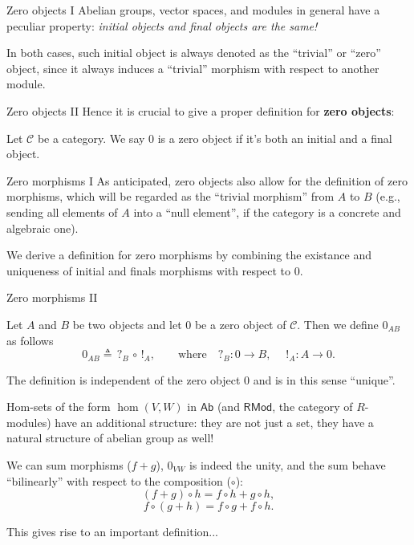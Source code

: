 \documentclass{beamer}
\newcommand{\cat}[1]{\mathsf{#1}}
\begin{document}
\begin{frame}{Zero objects I}
    Abelian groups, vector spaces, and modules in general have a peculiar property: \textit{initial objects and
    final objects are the same!} \medskip
    
    In both cases, such initial object is always
    denoted as the ``trivial'' or ``zero'' object, since it always induces a
    ``trivial'' morphism with respect to another module.
\end{frame}

\begin{frame}{Zero objects II}
    Hence it is crucial to give a proper definition for \textbf{zero objects}: \medskip
    
    \begin{definition}
        Let $\mathcal{C}$ be a category. We say $0$ is a
        zero object if it's both an initial and
        a final object.
    \end{definition}
\end{frame}

\begin{frame}{Zero morphisms I}
    As anticipated, zero objects also allow for the
    definition of zero morphisms, which will be regarded as the
    ``trivial morphism'' from $A$ to $B$ (e.g., sending all elements
    of $A$ into a ``null element'', if the category is a concrete and
    algebraic one). \medskip

    We derive a definition for zero morphisms
    by combining the existance and uniqueness of initial and finals morphisms
    with respect to $0$.
\end{frame}

\begin{frame}{Zero morphisms II}
    \begin{definition}
        Let $A$ and $B$ be two objects and let $0$ be a zero
        object of $\mathcal{C}$. Then we define $0_{AB}$ as
        follows
        \[
            0_{AB} \triangleq \, ?_{B} \, \circ \, !_{A}, \qquad \text{where} \quad ?_B : 0 \to B, \quad\; !_A : A \to 0.
        \]
    \end{definition}

    The definition is independent of the zero object $0$ and is
    in this sense ``unique''.
\end{frame}

\begin{frame}
    Hom-sets of the form $\hom(V, W)$ in $\cat{Ab}$ (and $\cat{RMod}$, the category
    of $R$-modules) have an additional
    structure: they are not just a set, they have a natural structure
    of abelian group as well! \medskip

    We can sum morphisms ($f + g$), $0_{VW}$ is indeed the unity,
    and the sum behave
    ``bilinearly'' with respect to the composition ($\circ$):
    \[
        (f + g) \circ h = f \circ h + g \circ h,
    \]
    \[
        f \circ (g + h) = f \circ g + f \circ h.
    \]

    This gives rise to an important definition...
\end{frame}
\end{document}

